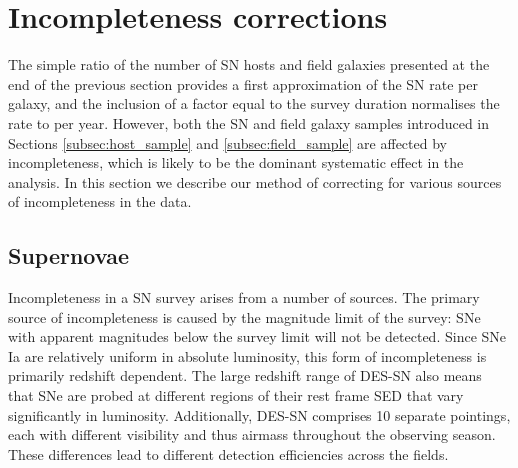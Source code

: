 \documentclass[fleqn,usenatbib]{mnras}
\begin{document}
\section{Incompleteness corrections}
\label{sec:incompleteness}
The simple ratio of the number of SN hosts and field galaxies presented at the end of the previous section provides a first approximation of the SN rate per galaxy, and the inclusion of a factor equal to the survey duration normalises the rate to per year. However, both the SN and field galaxy samples introduced in Sections \ref{subsec:host_sample} and \ref{subsec:field_sample} are affected by incompleteness, which is likely to be the dominant systematic effect in the analysis. In this section we describe our method of correcting for various sources of incompleteness in the data.

\subsection{Supernovae \label{subsec:incompleteness_SNe}}

Incompleteness in a SN survey arises from a number of sources. The primary source of incompleteness is caused by the magnitude limit of the survey: SNe with apparent magnitudes below the survey limit will not be detected. Since SNe Ia are relatively uniform in absolute luminosity, this form of incompleteness is primarily redshift dependent. The large redshift range of DES-SN also means that SNe are probed at different regions of their rest frame SED that vary significantly in luminosity. Additionally, DES-SN comprises 10 separate pointings, each with different visibility and thus airmass throughout the observing season. These differences lead to different detection efficiencies across the fields.
\end{document}
